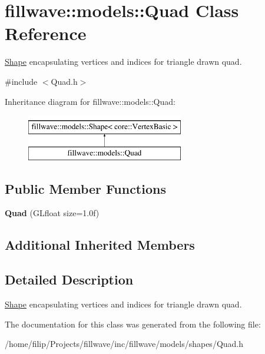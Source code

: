 \hypertarget{classfillwave_1_1models_1_1Quad}{}\section{fillwave\+:\+:models\+:\+:Quad Class Reference}
\label{classfillwave_1_1models_1_1Quad}


\hyperlink{classfillwave_1_1models_1_1Shape}{Shape} encapsulating vertices and indices for triangle drawn quad.  




{\ttfamily \#include $<$Quad.\+h$>$}

Inheritance diagram for fillwave\+:\+:models\+:\+:Quad\+:\begin{figure}[H]
\begin{center}
\leavevmode
\includegraphics[height=2.000000cm]{classfillwave_1_1models_1_1Quad}
\end{center}
\end{figure}
\subsection*{Public Member Functions}
\begin{DoxyCompactItemize}
\item 
\hypertarget{classfillwave_1_1models_1_1Quad_af6ab4dcd842e913813cee41fb958c10f}{}{\bfseries Quad} (G\+Lfloat size=1.\+0f)\label{classfillwave_1_1models_1_1Quad_af6ab4dcd842e913813cee41fb958c10f}

\end{DoxyCompactItemize}
\subsection*{Additional Inherited Members}


\subsection{Detailed Description}
\hyperlink{classfillwave_1_1models_1_1Shape}{Shape} encapsulating vertices and indices for triangle drawn quad. 

The documentation for this class was generated from the following file\+:\begin{DoxyCompactItemize}
\item 
/home/filip/\+Projects/fillwave/inc/fillwave/models/shapes/Quad.\+h\end{DoxyCompactItemize}
